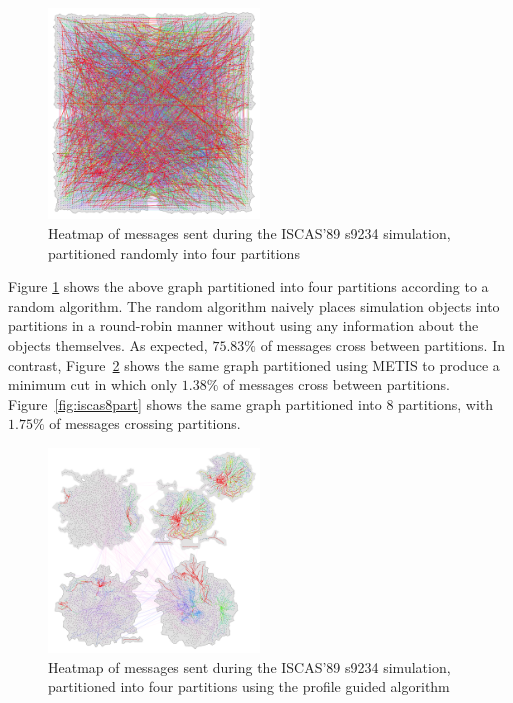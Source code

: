 \documentclass{wscpaperproc}
\begin{document}
\begin{figure}
\centering
\includegraphics[clip=true,width=0.5\textwidth]{figs/s9234_4rr}
\caption{Heatmap of messages sent during the ISCAS'89 s9234 simulation, partitioned
randomly into four partitions}\label{fig:iscas4rr}
\end{figure}

Figure \ref{fig:iscas4rr} shows the above graph partitioned into four partitions according to a random algorithm. The random algorithm naively places simulation objects into partitions in a round-robin manner without using any information about the objects themselves. As expected, \(75.83\%\) of messages cross between partitions. In contrast, Figure~\ref{fig:iscas4part} shows the same graph partitioned using METIS to produce a minimum cut in which only \(1.38\%\) of messages cross between partitions. Figure~\ref{fig:iscas8part} shows the same graph partitioned into 8 partitions, with \(1.75\%\) of messages crossing partitions.

\begin{figure}
\centering
\includegraphics[clip=true,width=0.5\textwidth]{figs/s9234_4part}
\caption{Heatmap of messages sent during the ISCAS'89 s9234 simulation, partitioned into
four partitions using the profile guided algorithm}\label{fig:iscas4part} 
\end{figure}
\end{document}
